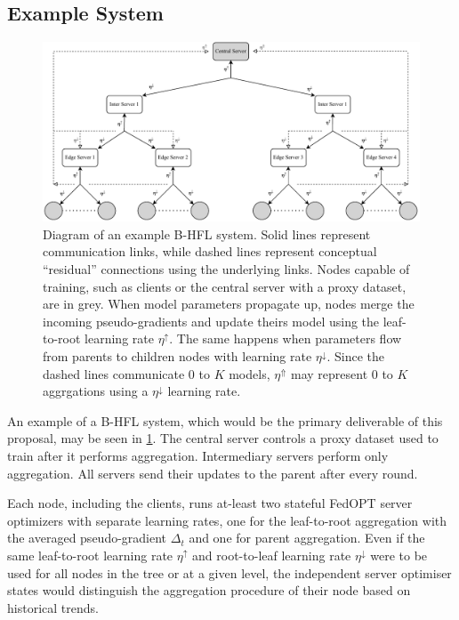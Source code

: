 \subsection{Example System}\label{sec:example_system}
\begin{figure}[h]
    \centering
    \includegraphics[clip,width=\columnwidth]{plots/Tree_Structure.drawio.pdf}
    \caption[System Diagram]{Diagram of an example B-HFL system. Solid lines represent communication links, while dashed lines represent conceptual ``residual'' connections using the underlying links. Nodes capable of training, such as clients or the central server with a proxy dataset, are in grey. When model parameters propagate up, nodes merge the incoming pseudo-gradients and update theirs model using the leaf-to-root learning rate $\eta^\uparrow$. The same happens when parameters flow from parents to children nodes with learning rate $\eta^\downarrow$. Since the dashed lines communicate $0$ to $K$ models, $\eta^\Uparrow$ may represent $0$ to $K$ aggrgations using a $\eta^\downarrow$ learning rate. }\label{fig:TreeStructure}
\end{figure}

An example of a B-HFL system, which would be the primary deliverable of this proposal, may be seen in \cref{fig:TreeStructure}. The central server controls a proxy dataset used to train after it performs aggregation. Intermediary servers perform only aggregation. All servers send their updates to the parent after every round.

Each node, including the clients, runs at-least two stateful FedOPT server optimizers with separate learning rates, one for the leaf-to-root aggregation with the averaged pseudo-gradient $\Delta_t$ and one for parent aggregation. Even if the same leaf-to-root learning rate $\eta^\uparrow$ and root-to-leaf learning rate $\eta^\downarrow$ were to be used for all nodes in the tree or at a given level, the independent server optimiser states would distinguish the aggregation procedure of their node based on historical trends.

